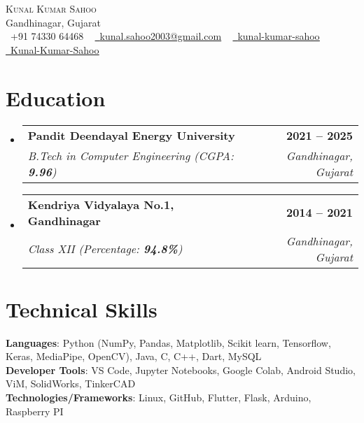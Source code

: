 \documentclass[letterpaper,11pt]{article}
\makeatletter
\newcommand{\resumeSubheading}[4]{
  \vspace{-2pt}\item
    \begin{tabular*}{1.0\textwidth}[t]{l@{\extracolsep{\fill}}r}
      \textbf{#1} & \textbf{\small #2} \\
      \textit{\small#3} & \textit{\small #4} \\
    \end{tabular*}\vspace{-7pt}
}
\newcommand{\resumeSubHeadingListStart}{\begin{itemize}[leftmargin=0.0in, label={}]}
\newcommand{\resumeSubHeadingListEnd}{\end{itemize}}
\makeatother
\begin{document}

\begin{center}
    {\Huge \scshape Kunal Kumar Sahoo} \\ \vspace{1pt}
    Gandhinagar, Gujarat \\ \vspace{1pt}
    \small \raisebox{-0.1\height}\faPhone\ +91 74330 64468 ~ \href{mailto:kunal.sahoo2003@gmail.com}{\raisebox{-0.2\height}\faEnvelope\  \underline{kunal.sahoo2003@gmail.com}} ~ 
    \href{https://linkedin.com/in/}{\raisebox{-0.2\height}\faLinkedin\ \underline{kunal-kumar-sahoo}}  ~
    \href{https://github.com/}{\raisebox{-0.2\height}\faGithub\ \underline{Kunal-Kumar-Sahoo}}
    \vspace{-8pt}
\end{center}


\section{Education}
  \resumeSubHeadingListStart
    \resumeSubheading
      {Pandit Deendayal Energy University}{2021 -- 2025}
      {B.Tech in Computer Engineering (CGPA: \textbf{9.96})}{Gandhinagar, Gujarat}
    \resumeSubheading  
      {Kendriya Vidyalaya No.1, Gandhinagar}{2014 -- 2021}
      {Class XII (Percentage: \textbf{94.8\%})}{Gandhinagar, Gujarat}
  \resumeSubHeadingListEnd

\section{Technical Skills}
 \begin{itemize}[leftmargin=0.15in, label={}]
    \small{\item{
     \textbf{Languages}{: Python (NumPy, Pandas, Matplotlib, Scikit learn, Tensorflow, Keras, MediaPipe, OpenCV), Java, C, C++, Dart, MySQL} \\
     \textbf{Developer Tools}{: VS Code, Jupyter Notebooks, Google Colab, Android Studio, ViM, SolidWorks, TinkerCAD} \\
     \textbf{Technologies/Frameworks}{: Linux, GitHub, Flutter, Flask, Arduino, Raspberry PI} \\
    }}
 \end{itemize}
 \vspace{-16pt}
\end{document}
